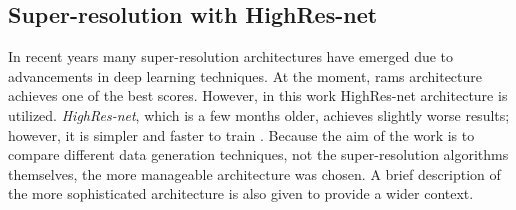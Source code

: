 \subsection{Super-resolution with HighRes-net}
\label{sec:sr-highresnet}
In recent years many super-resolution architectures have emerged due to advancements in deep learning techniques.
At the moment, \gls{rams} architecture achieves one of the best scores.
However, in this work HighRes-net architecture is utilized.
\textit{HighRes-net}, which is a few months older, achieves slightly worse results; however, it is simpler and faster to train \cite{paperswithcode-ranking}.
Because the aim of the work is to compare different data generation techniques, not the super-resolution algorithms themselves, the more manageable architecture was chosen.
A brief description of the more sophisticated architecture is also given to provide a wider context.

